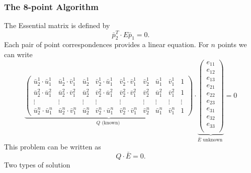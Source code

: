 \documentclass[a4paper,12 pt]{article}
\theoremstyle{definition}
\theoremstyle{remark}
\theoremstyle{definition}
\theoremstyle{definition}
\theoremstyle{definition}
\theoremstyle{remark}
\theoremstyle{definition}
\begin{document}
\subsubsection*{The 8-point Algorithm}
The Essential matrix is defined by
\begin{equation}
\bar{p}_2^T\cdot E \bar{p}_1=0.
\end{equation}
Each pair of point correspondences provides a linear equation. For $n$ points we can write
\begin{equation}
\underbrace{\begin{pmatrix}
\bar{u}_2^1\cdot \bar{u}_1^1&\bar{u}_2^1\cdot \bar{v}_1^1&\bar{u}_2^1&\bar{v}_2^1\cdot \bar{u}_1^1&\bar{v}_2^1\cdot \bar{v}_1^1&\bar{v}_2^1&\bar{u}_1^1&\bar{v}_1^1&1\\
\bar{u}_2^2\cdot \bar{u}_1^2&\bar{u}_2^2\cdot \bar{v}_1^2&\bar{u}_2^2&\bar{v}_2^2\cdot \bar{u}_1^2&\bar{v}_2^2\cdot \bar{v}_1^2&\bar{v}_2^2&\bar{u}_1^2&\bar{v}_1^2&1\\
\vdots &\vdots &\vdots &\vdots &\vdots &\vdots &\vdots &\vdots &\vdots \\
\bar{u}_2^n\cdot \bar{u}_1^n&\bar{u}_2^n\cdot \bar{v}_1^n&\bar{u}_2^n&\bar{v}_2^n\cdot \bar{u}_1^n&\bar{v}_2^n\cdot \bar{v}_1^n&\bar{v}_2^n&\bar{u}_1^n&\bar{v}_1^n&1
\end{pmatrix}}_{Q \text{ (known) }}\cdot  \underbrace{\begin{pmatrix}
e_{11}\\
e_{12}\\
e_{13}\\
e_{21}\\
e_{22}\\
e_{23}\\
e_{31}\\
e_{32}\\
e_{33}\\
 \end{pmatrix}}_{\bar{E} \text{ unknown }}=0
\end{equation}
This problem can be written as
\begin{equation}
Q\cdot \bar{E}=0.
\end{equation}
Two types of solution
\end{document}
